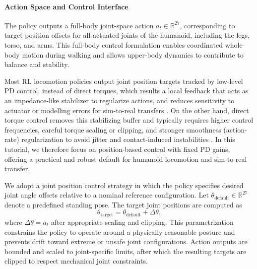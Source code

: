 \paragraph{Action Space and Control Interface}
\label{sec:act_control}
The policy outputs a full-body joint-space action $a_t \in \mathbb{R}^{27}$, corresponding to target position offsets for all actuated joints of the humanoid, including the legs, torso, and arms. This full-body control formulation enables coordinated whole-body motion during walking and allows upper-body dynamics to contribute to balance and
stability.

Most RL locomotion policies output joint position targets tracked by low-level PD control, instead of direct torques, which results a local feedback that acts as an impedance-like stabilizer to regularize actions, and reduces sensitivity to actuator or modelling errors for sim-to-real transfers \citep{kumar2021rmarapidmotoradaptation, gu2024humanoidgymreinforcementlearninghumanoid, doi:10.1126/scirobotics.adi9579}. On the other hand, direct torque control removes this stabilizing buffer and typically requires higher control frequencies, careful torque scaling or clipping, and stronger smoothness (action-rate) regularization to avoid jitter and contact-induced instabilities \citep{chen2023learningtorquecontrolquadrupedal, Peng_2017}. In this tutorial, we therefore focus on position-based control with fixed PD gains, offering a practical and robust default for humanoid locomotion and sim-to-real transfer.


We adopt a joint position control strategy in which the policy specifies desired joint angle offsets relative to a nominal reference configuration. Let $\theta_{\text{default}} \in \mathbb{R}^{27}$ denote a predefined standing
pose. The target joint positions are computed as
\begin{equation}
    \theta_{\text{target}} = \theta_{\text{default}} + \Delta \theta,
\end{equation}
where $\Delta \theta = a_t$ after appropriate scaling and clipping.
This parametrization constrains the policy to operate around a physically
reasonable posture and prevents drift toward extreme or unsafe joint
configurations. Action outputs are bounded and scaled to joint-specific limits, after which the resulting targets are clipped to respect mechanical joint constraints.


